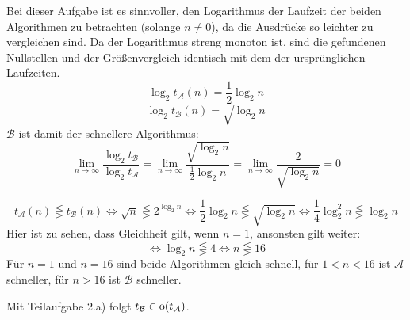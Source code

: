 \begin{flushenum}
\item 
	\begin{flushalpha}
	\item
		Bei dieser Aufgabe ist es sinnvoller, den Logarithmus der
		Laufzeit der beiden Algorithmen zu betrachten (solange $n \neq
		0$), da die Ausdrücke so leichter zu vergleichen sind. Da der
		Logarithmus streng monoton ist, sind die gefundenen Nullstellen
		und der Größenvergleich identisch mit dem der ursprünglichen
		Laufzeiten.
		\[ \log_2 t_\mathcal{A}(n) = \frac{1}{2} \log_2 n \]
		\[ \log_2 t_\mathcal{B}(n) = \sqrt{\log_2 n} \]
		$\mathcal{B}$ ist damit der schnellere Algorithmus:
		\[ \lim_{n \rightarrow \infty} \frac{\log_2 t_\mathcal{B}}{\log_2 t_\mathcal{A}} =
		   \lim_{n \rightarrow \infty} \frac{\sqrt{\log_2 n}}{\frac{1}{2} \log_2 n} =
		   \lim_{n \rightarrow \infty} \frac{2}{\sqrt{\log_2 n}} = 0 \]
	\item
		\[ t_\mathcal{A}(n) \lesseqgtr t_\mathcal{B}(n) \Leftrightarrow \sqrt{n} \lesseqgtr 2^{\log_2 n}
		   \Leftrightarrow \frac{1}{2} \log_2 n \lesseqgtr \sqrt{\log_2 n} \Leftrightarrow \frac{1}{4} \log_2^2 n\lesseqgtr \log_2 n \]
		Hier ist zu sehen, dass Gleichheit gilt, wenn $n = 1$, ansonsten gilt weiter:
		\[ \Leftrightarrow \log_2 n \lesseqgtr 4 \Leftrightarrow n \lesseqgtr 16 \]
		Für $n=1$ und $n=16$ sind beide Algorithmen gleich schnell, für
		$1 < n < 16$ ist $\mathcal{A}$ schneller, für $n > 16$ ist
		$\mathcal{B}$ schneller.
	
	\item
		Mit Teilaufgabe 2.a) folgt $t_\mathcal{B} \in \hbox{o}(t_\mathcal{A})$.
	\end{flushalpha}
\end{flushenum}
